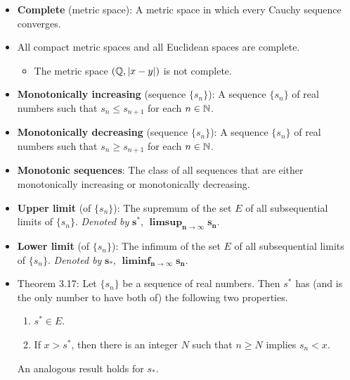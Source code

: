 \documentclass[../../notes.tex]{subfiles}
\begin{document}
\begin{itemize}
\begin{enumerate}[label={(\alph*)}]
    \end{enumerate}
    \item \textbf{Complete} (metric space): A metric space in which every Cauchy sequence converges.
    \item All compact metric spaces and all Euclidean spaces are complete.
    \begin{itemize}
        \item The metric space $(\mathbb{Q},|x-y|)$ is not complete.
    \end{itemize}
    \item \textbf{Monotonically increasing} (sequence $\{s_n\}$): A sequence $\{s_n\}$ of real numbers such that $s_n\leq s_{n+1}$ for each $n\in\mathbb{N}$.
    \item \textbf{Monotonically decreasing} (sequence $\{s_n\}$): A sequence $\{s_n\}$ of real numbers such that $s_n\geq s_{n+1}$ for each $n\in\mathbb{N}$.
    \item \textbf{Monotonic sequences}: The class of all sequences that are either monotonically increasing or monotonically decreasing.
    \item \textbf{Upper limit} (of $\{s_n\}$): The supremum of the set $E$ of all subsequential limits of $\{s_n\}$. \emph{Denoted by} $\bm{s^*}$, $\bm{\limsup_{n\to\infty}s_n}$.
    \item \textbf{Lower limit} (of $\{s_n\}$): The infimum of the set $E$ of all subsequential limits of $\{s_n\}$. \emph{Denoted by} $\bm{s_*}$, $\bm{\liminf_{n\to\infty}s_n}$.
    \item Theorem 3.17: Let $\{s_n\}$ be a sequence of real numbers. Then $s^*$ has (and is the only number to have both of) the following two properties.
    \begin{enumerate}[label={(\alph*)}]
        \item $s^*\in E$.
        \item If $x>s^*$, then there is an integer $N$ such that $n\geq N$ implies $s_n<x$.
    \end{enumerate}
    An analogous result holds for $s_*$.
\end{itemize}
\end{document}

